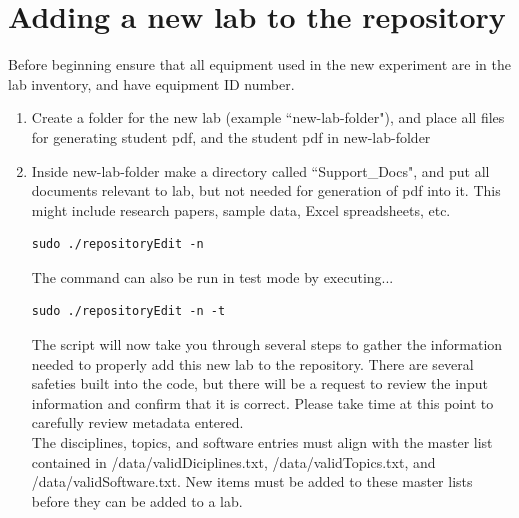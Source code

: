 \documentclass[justified]{book}
\begin{document}
\section{Adding a new lab to the repository}

Before beginning ensure that all equipment used in the new experiment are in the lab inventory, and have equipment ID number. 

\begin{enumerate}
\item Create a folder for the new lab (example ``new-lab-folder"), and place all files for generating student pdf, and the student pdf in new-lab-folder
\item Inside new-lab-folder make a directory called ``Support\_Docs", and put all documents relevant to lab, but not needed for generation of pdf into it. This might include research papers, sample data, Excel spreadsheets, etc.



\begin{lstlisting}[backgroundcolor = \color{light-gray}]
sudo ./repositoryEdit -n
\end{lstlisting}

The command can also be run in test mode by executing...

\begin{lstlisting}[backgroundcolor = \color{light-gray}]
sudo ./repositoryEdit -n -t
\end{lstlisting}

The script will now take you through several steps to gather the information needed to properly add this new lab to the repository. There are several safeties built into the code, but there will be a request to review the input information and confirm that it is correct. Please take time at this point to carefully review metadata entered.\\

The disciplines, topics, and software entries must align with the master list contained in /data/validDiciplines.txt, /data/validTopics.txt, and /data/validSoftware.txt. New items must be added to these master lists before they can be added to a lab.


\end{enumerate}
\end{document}
